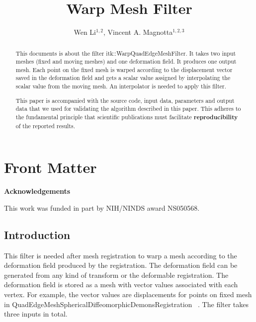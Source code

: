 \documentclass{InsightArticle}
\title{Warp Mesh Filter}
\author{Wen Li$^{1,2}$, Vincent A. Magnotta$^{1,2,3}$}
\makeatletter
\newcommand\ackname{Acknowledgements}
\newenvironment{acknowledgements}{%
      \titlepage
      \null\vfil
      \@beginparpenalty\@lowpenalty
      \begin{center}%
        \bfseries \ackname
        \@endparpenalty\@M
      \end{center}}%
     {\par\vfil\null\endtitlepage}
\newenvironment{acknowledgements}{%
      \if@twocolumn
        \section*{\abstractname}%
      \else
        \small
        \begin{center}%
          {\bfseries \ackname\vspace{-.5em}\vspace{\z@}}%
        \end{center}%
        \quotation
      \fi}
      {\if@twocolumn\else\endquotation\fi}
\newcommand{\IJhandlerIDnumber}{3201}
\makeatother
\begin{document}
%
% 
\IJhandlefooter{\IJhandlerIDnumber}


\ifpdf
\else
\fi


\maketitle


\ifhtml
\chapter*{Front Matter\label{front}}
\fi


\begin{abstract}
 
This documents is about the filter itk::WarpQuadEdgeMeshFilter.  It
takes two input meshes (fixed and moving meshes) and one deformation field. 
It produces one output mesh.
Each point on the fixed mesh is warped according to the displacement 
vector saved in the deformation field and gets a scalar value assigned 
by interpolating the scalar value from the moving mesh. An interpolator 
is needed 
to apply this filter.

This paper is accompanied with the source code, input data, parameters and
output data that we used for validating the algorithm described in this paper.
This adheres to the fundamental principle that scientific publications must
facilitate \textbf{reproducibility} of the reported results.
\end{abstract}

\begin{acknowledgements}
This work was funded in part by NIH/NINDS award NS050568.
\end{acknowledgements}

\tableofcontents

\section{Introduction}
This filter is needed after mesh registration to warp a mesh according to the
deformation field produced by the registration.  The deformation field can be generated 
from any kind of transform or the deformable registration. The deformation field
is stored as a mesh with vector values associated with each vertex. For example, 
the vector values are displacements for
 points on fixed mesh in QuadEdgeMeshSphericalDiffeomorphicDemonsRegistration
~\cite{MeshDemonsRegistrationIJ2009}. 
The filter takes three inputs in total. 
\end{document}
